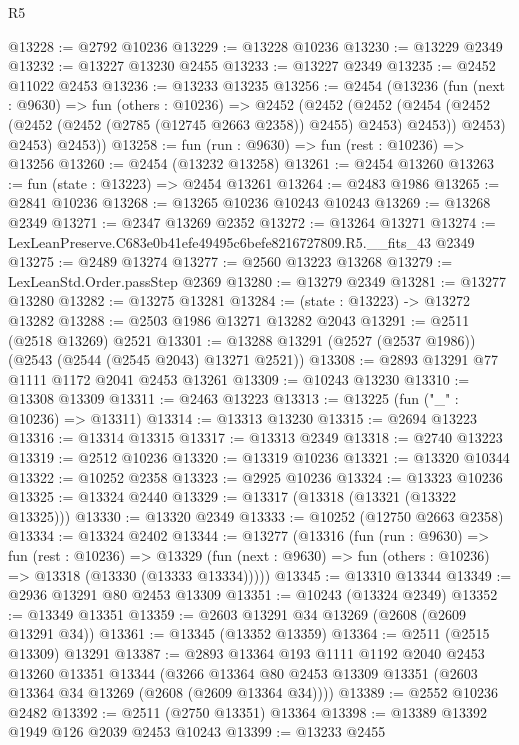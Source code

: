 \begin{lexlean}{R5}
\begin{coremodule}
@13228 := @2792 @10236
@13229 := @13228 @10236
@13230 := @13229 @2349
@13232 := @13227 @13230 @2455
@13233 := @13227 @2349
@13235 := @2452 @11022 @2453
@13236 := @13233 @13235
@13256 := @2454
    (@13236
      (fun (next : @9630) =>
      fun (others : @10236) =>
      @2452
        (@2452
          (@2452
            (@2454 (@2452 (@2452 (@2452 (@2785 (@12745 @2663 @2358)) @2455) @2453) @2453))
            @2453)
          @2453)
        @2453))
@13258 := fun (run : @9630) => fun (rest : @10236) => @13256
@13260 := @2454 (@13232 @13258)
@13261 := @2454 @13260
@13263 := fun (state : @13223) => @2454 @13261
@13264 := @2483 @1986
@13265 := @2841 @10236
@13268 := @13265 @10236 @10243 @10243
@13269 := @13268 @2349
@13271 := @2347 @13269 @2352
@13272 := @13264 @13271
@13274 := LexLeanPreserve.C683e0b41efe49495c6befe8216727809.R5.__fits_43 @2349
@13275 := @2489 @13274
@13277 := @2560 @13223 @13268
@13279 := LexLeanStd.Order.passStep @2369
@13280 := @13279 @2349
@13281 := @13277 @13280
@13282 := @13275 @13281
@13284 := (state : @13223) -> @13272 @13282
@13288 := @2503 @1986 @13271 @13282 @2043
@13291 := @2511 (@2518 @13269) @2521
@13301 := @13288 @13291 (@2527 (@2537 @1986)) (@2543 (@2544 (@2545 @2043) @13271 @2521))
@13308 := @2893 @13291 @77 @1111 @1172 @2041 @2453 @13261
@13309 := @10243 @13230
@13310 := @13308 @13309
@13311 := @2463 @13223
@13313 := @13225 (fun ("_" : @10236) => @13311)
@13314 := @13313 @13230
@13315 := @2694 @13223
@13316 := @13314 @13315
@13317 := @13313 @2349
@13318 := @2740 @13223
@13319 := @2512 @10236
@13320 := @13319 @10236
@13321 := @13320 @10344
@13322 := @10252 @2358
@13323 := @2925 @10236
@13324 := @13323 @10236
@13325 := @13324 @2440
@13329 := @13317 (@13318 (@13321 (@13322 @13325)))
@13330 := @13320 @2349
@13333 := @10252 (@12750 @2663 @2358)
@13334 := @13324 @2402
@13344 := @13277
    (@13316
      (fun (run : @9630) =>
      fun (rest : @10236) =>
      @13329 (fun (next : @9630) => fun (others : @10236) => @13318 (@13330 (@13333 @13334)))))
@13345 := @13310 @13344
@13349 := @2936 @13291 @80 @2453 @13309
@13351 := @10243 (@13324 @2349)
@13352 := @13349 @13351
@13359 := @2603 @13291 @34 @13269 (@2608 (@2609 @13291 @34))
@13361 := @13345 (@13352 @13359)
@13364 := @2511 (@2515 @13309) @13291
@13387 := @2893
    @13364
    @193
    @1111
    @1192
    @2040
    @2453
    @13260
    @13351
    @13344
    (@3266 @13364 @80 @2453 @13309 @13351 (@2603 @13364 @34 @13269 (@2608 (@2609 @13364 @34))))
@13389 := @2552 @10236 @2482
@13392 := @2511 (@2750 @13351) @13364
@13398 := @13389 @13392 @1949 @126 @2039 @2453 @10243
@13399 := @13233 @2455

\end{coremodule}
\end{lexlean}
